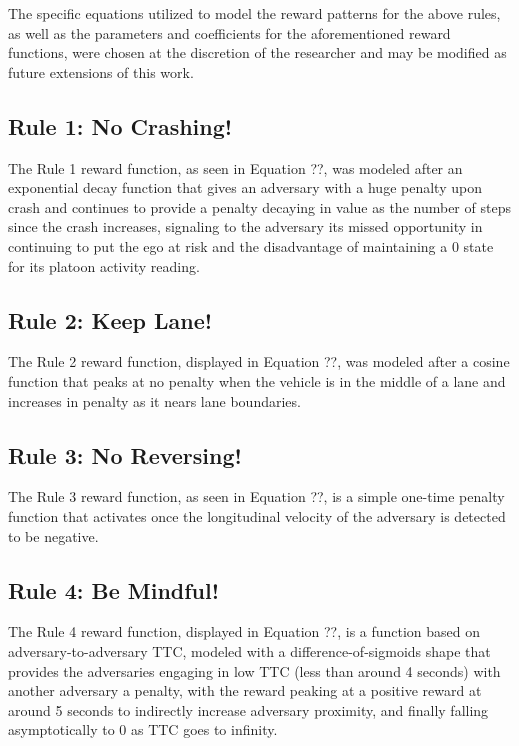 \documentclass[12pt, a4paper]{report}
\begin{document}
The specific equations utilized to model the reward patterns for the above rules, as well as the parameters  and coefficients for the aforementioned reward functions, were chosen at the discretion of the researcher and may be modified as future extensions of this work.

\subsection{Rule 1: No Crashing!}

The Rule 1 reward function, as seen in Equation ??, was modeled after an exponential decay function that gives an adversary with a huge penalty upon crash and continues to provide a penalty decaying in value as the number of steps since the crash increases, signaling to the adversary its missed opportunity in continuing to put the ego at risk and the disadvantage of maintaining a 0 state for its platoon activity reading.

\subsection{Rule 2: Keep Lane!}

The Rule 2 reward function, displayed in Equation ??, was modeled after a cosine function that peaks at no penalty when the vehicle is in the middle of a lane and increases in penalty as it nears lane boundaries.

\subsection{Rule 3: No Reversing!}

The Rule 3 reward function, as seen in Equation ??, is a simple one-time penalty function that activates once the longitudinal velocity of the adversary is detected to be negative.

\subsection{Rule 4: Be Mindful!}

The Rule 4 reward function, displayed in Equation ??, is a function based on adversary-to-adversary TTC, modeled with a difference-of-sigmoids shape that provides the adversaries engaging in low TTC (less than around 4 seconds) with another adversary a penalty, with the reward peaking at a positive reward at around 5 seconds to indirectly increase adversary proximity, and finally falling asymptotically to 0 as TTC goes to infinity.
\end{document}
